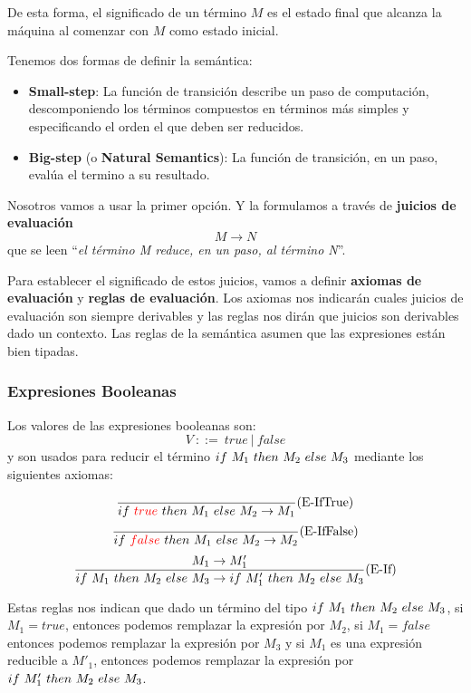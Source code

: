 De esta forma, el significado de un término $M$ es el estado final que alcanza la máquina al comenzar con $M$ como estado inicial.

Tenemos dos formas de definir la semántica:
\begin{itemize}
    \item \textbf{Small-step}: La función de transición describe un paso de computación, descomponiendo los términos compuestos en términos más simples y especificando el orden el que deben ser reducidos.
    \item \textbf{Big-step} (o \textbf{Natural Semantics}): La función de transición, en un paso, evalúa el termino a su resultado.
\end{itemize}

Nosotros vamos a usar la primer opción. Y la formulamos a través de \textbf{juicios de evaluación} 
$$M\to N$$ que se leen ``\textit{el término M reduce, en un paso, al término N}''.

Para establecer el significado de estos juicios, vamos a definir \textbf{axiomas de evaluación} y \textbf{reglas de evaluación}. Los axiomas nos indicarán cuales juicios de evaluación son siempre derivables y las reglas nos dirán que juicios son derivables dado un contexto. Las reglas de la semántica asumen que las expresiones están bien tipadas.

\subsubsection{Expresiones Booleanas}\label{calculo_lambda:semantica:booleanas}
Los valores de las  expresiones booleanas son:
$$ V~::=~true~|~false$$
y son usados para reducir el término $if~ M_1~ then~ M_2~ else~ M_3$ mediante los siguientes axiomas:

\begin{equation*}
\frac{}{if~ \color{red}true\color{black}~ then~ M_1~ else~ M_2 \to M_1}(\text{E-IfTrue})
\end{equation*}
\vspace*{5mm}
\begin{equation*}
\frac{}{if~ \color{red}false\color{black}~ then~ M_1~ else~ M_2 \to M_2}(\text{E-IfFalse})
\end{equation*}
\vspace*{5mm}
\begin{equation*}
\frac{M_1\to M'_1}{if~ M_1~ then~ M_2~ else~ M_3\to if~ M'_1~ then~ M_2~ else~ M_3}(\text{E-If})
\end{equation*}

\vspace*{5mm}
Estas reglas nos indican que dado un término del tipo $if~ M_1~ then~ M_2~ else~ M_3$, si $M_1 = true$, entonces podemos remplazar la expresión por $M_2$, si $M_1=false$ entonces podemos remplazar la expresión por $M_3$ y si $M_1$ es una expresión reducible a $M'_1$, entonces podemos remplazar la expresión por $if~ M'_1~ then~ M_2~ else~ M_3$.

